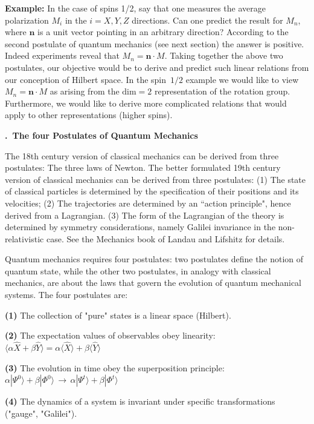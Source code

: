 \documentclass[onecolumn,fleqn, 11pt]{revtex4}
\renewcommand{\thesubsection}{\arabic{subsection}}
\renewcommand{\thesubsubsection}{\arabic{subsubsection}}
\newcommand{\sheadC}[1]
{
\addtocounter{subsubsection}{1}
\vspace{5mm}
{\bf \thesubsection.\thesubsubsection \ #1}  
\nopagebreak
\phantomsection
}
\begin{document}
{\bf Example:} In the case of spins 1/2,  say that one measures 
the average polarization $M_i$ in the $i=X,Y,Z$ directions.  
Can one predict the result for $M_n$, where $\bm{n}$ is 
a unit vector pointing in an arbitrary direction?    
According to the second postulate of quantum mechanics (see next section) 
the answer is positive. Indeed experiments reveal that $M_n = \bm{n} \cdot M$.
Taking together the above two postulates, our objective would be 
to derive and predict such linear relations from 
our conception of Hilbert space. In the spin~$1/2$ example 
we would like to view $M_n = \bm{n} \cdot M$ as arising from 
the $\mbox{dim}{=}2$ representation of the rotation group. 
Furthermore, we would like to derive more complicated relations that 
would apply to other representations (higher spins).



\sheadC{The four Postulates of Quantum Mechanics}

The 18th century version of classical mechanics can be derived 
from three postulates: The three laws of Newton.
The better formulated 19th century version 
of classical mechanics can be derived from three postulates: 
(1) The state of classical particles is determined 
by the specification of their positions and its velocities; 
(2) The trajectories are determined by an ``action principle", 
hence derived from a Lagrangian. 
(3) The form of the Lagrangian of the theory is determined by symmetry considerations,  
namely Galilei invariance in the non-relativistic case.
See the Mechanics book of Landau and Lifshitz for details. 


Quantum mechanics requires four postulates: 
two postulates define the notion of quantum state, 
while the other two postulates, in analogy with 
classical mechanics, are about the laws that 
govern the evolution of quantum mechanical systems.
The four postulates are: 

{\bf (1)} 
The collection of "pure" states is a linear space (Hilbert).

{\bf (2)} 
The expectation values of observables obey linearity:   
${\langle \alpha \hat{X} + \beta \hat{Y} \rangle = \alpha \langle \hat{X}\rangle + \beta \langle \hat{Y} \rangle}$ 

{\bf (3)} 
The evolution in time obey the superposition principle:
${\alpha | \Psi^0 \rangle + \beta | \Phi^0 \rangle 
\, \rightarrow\, \alpha | \Psi^t \rangle + \beta | \Phi^t \rangle}$

{\bf (4)} 
The dynamics of a system is invariant 
under specific transformations ("gauge", "Galilei"). \\
\end{document}
